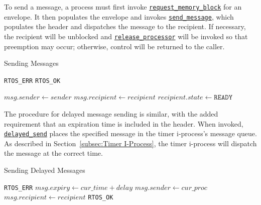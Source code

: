 \documentclass[12pt]{report}
\begin{document}
To send a message, a process must first invoke \hyperref[alg:requestingmemoryblocks]{\texttt{request_memory_block}} for an envelope. It then populates the envelope and invokes \hyperref[alg:sendingmessages]{\texttt{send_message}}, which populates the header and dispatches the message to the recipient. If necessary, the recipient will be unblocked and \hyperref[alg:releasingtheprocessor]{\texttt{release_processor}} will be invoked so that preemption may occur; otherwise, control will be returned to the caller.\\

\begin{algorithm}
\caption{Sending Messages}
\label{alg:sendingmessages}
\begin{algorithmic}[1]
        \State \Return \texttt{RTOS_ERR}
    \EndIf
            \State \Return {}
        \EndIf
    \EndIf
    \State \Return \texttt{RTOS_OK}
\EndProcedure

\Statex

    \State $msg.sender \leftarrow sender$
    \State $msg.recipient \leftarrow recipient$
    \State {}
        \State {}
        \State $recipient.state \leftarrow \texttt{READY}$
        \State {}
        \State {} 
    \Else
        \State {}
    \EndIf
\EndProcedure
\end{algorithmic}
\end{algorithm}

The procedure for delayed message sending is similar, with the added requirement that an expiration time is included in the header. When invoked, \hyperref[alg:sendingdelayedmessages]{\texttt{delayed_send}} places the specified message in the timer i-process's message queue. As described in Section~\ref{subsec:Timer I-Process}, the timer i-process will dispatch the message at the correct time.\\

\begin{algorithm}
\caption{Sending Delayed Messages}
\label{alg:sendingdelayedmessages}
\begin{algorithmic}[1]
        \State \Return \texttt{RTOS_ERR}
    \EndIf
    \State $msg.expiry \leftarrow cur\_time + delay$
    \State $msg.sender \leftarrow cur\_proc$
    \State $msg.recipient \leftarrow recipient$
    \State {}
    \State \Return \texttt{RTOS_OK}
\EndProcedure
\end{algorithmic}
\end{algorithm}
\end{document}
